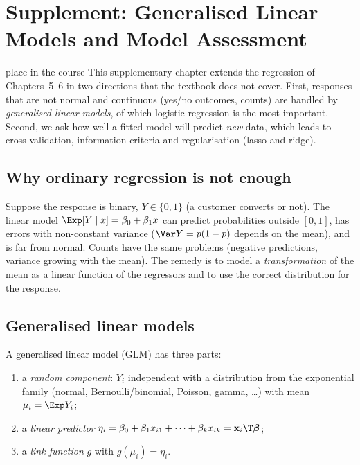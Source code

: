 \chapter{Supplement: Generalised Linear Models and Model Assessment}

\begin{nuance}{place in the course}
This supplementary chapter extends the regression of Chapters~5--6 in two directions that the textbook does not cover. First, responses that are not normal and continuous (yes/no outcomes, counts) are handled by \emph{generalised linear models}, of which logistic regression is the most important. Second, we ask how well a fitted model will predict \emph{new} data, which leads to cross-validation, information criteria and regularisation (lasso and ridge).
\end{nuance}

\section{Why ordinary regression is not enough}

Suppose the response is binary, $Y\in\{0,1\}$ (a customer converts or not). The linear model $\Exp[Y\mid x]=\beta_0+\beta_1x$ can predict probabilities outside $[0,1]$, has errors with non-constant variance ($\Var Y=p(1-p)$ depends on the mean), and is far from normal. Counts have the same problems (negative predictions, variance growing with the mean). The remedy is to model a \emph{transformation} of the mean as a linear function of the regressors and to use the correct distribution for the response.

\section{Generalised linear models}

\begin{definition}
A generalised linear model (GLM) has three parts:
\begin{enumerate}[label=(\arabic*)]
  \item a \emph{random component}: $Y_i$ independent with a distribution from the exponential family (normal, Bernoulli/binomial, Poisson, gamma, \dots) with mean $\mu_i=\Exp Y_i$;
  \item a \emph{linear predictor} $\eta_i=\beta_0+\beta_1x_{i1}+\dots+\beta_kx_{ik}=\mathbf{x}_i\T\boldsymbol\beta$;
  \item a \emph{link function} $g$ with $g(\mu_i)=\eta_i$.
\end{enumerate}
\end{definition}

